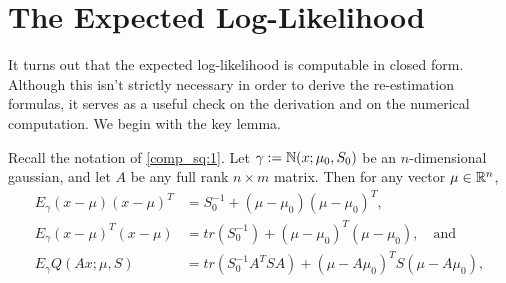 \documentclass[12pt,leqno]{article}
\begin{document}
  \section{The Expected Log-Likelihood}
    
    It turns out that the expected log-likelihood is computable in closed form.
    Although this isn't strictly necessary in order to derive the re-estimation formulas, it serves as a useful check on the
    derivation and on the numerical computation.  We begin with the key lemma.
    
  \begin{Lem}\label{exp_log}
    Recall the notation of \eqref{comp_sq:1}. Let $\gamma := {\mathbb N}(x;\mu_0,S_0)$ be an $n$-dimensional gaussian, and let $A$ be any
    full rank $n\times{m}$ matrix. Then for any vector $\mu\in{\mathbb R}^n$, 
    \begin{align}
      E_{\gamma}(x-\mu)(x-\mu)^T &= S_0^{-1} + (\mu-\mu_0)(\mu-\mu_0)^T, \label{E_xx^T}\\
      E_{\gamma}(x-\mu)^T(x - \mu) &=  tr(S_0^{-1}) + (\mu-\mu_0)^T(\mu-\mu_0),\quad\text{and}\label{E_x^Tx}\\
        E_{\gamma}{Q}(Ax;\mu,S) &=  tr(S_0^{-1}A^TSA) + (\mu-A\mu_0)^TS(\mu-A\mu_0), \label{E_Q}
    \end{align}
  \end{Lem}
\end{document}
